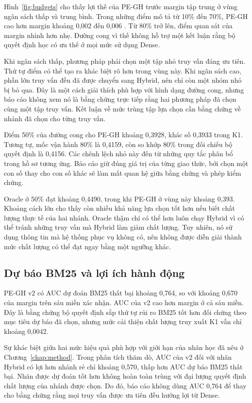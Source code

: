 Hình~\ref{fig:budgets} cho thấy lợi thế của PE-GH trước margin tập trung ở vùng ngân sách thấp và trung bình. Trong những điểm mô tả từ 10\% đến 70\%, PE-GH cao hơn margin khoảng 0,002 đến 0,006 \ndcg{}. Từ 80\% trở lên, điểm quan sát của margin nhỉnh hơn nhẹ. Đường cong vì thế không hỗ trợ một kết luận rằng bộ quyết định học có ưu thế ở mọi mức sử dụng Dense.

Khi ngân sách thấp, phương pháp phải chọn một tập nhỏ truy vấn đáng ưu tiên. Thứ tự điểm có thể tạo ra khác biệt rõ hơn trong vùng này. Khi ngân sách cao, phần lớn truy vấn đều đã được chuyển sang Hybrid, nên chỉ còn một nhóm nhỏ bị bỏ qua. Đây là một cách giải thích phù hợp với hình dạng đường cong, nhưng báo cáo không xem nó là bằng chứng trực tiếp rằng hai phương pháp đã chọn cùng một tập truy vấn. Kết luận về mức trùng tập lựa chọn cần bằng chứng về nhánh đã chọn cho từng truy vấn.

Điểm 50\% của đường cong cho PE-GH khoảng 0,3928, khác số 0,3933 trong K1. Tương tự, mốc vận hành 80\% là 0,4159, còn so khớp 80\% trong đối chiếu bộ quyết định là 0,4156. Các chênh lệch nhỏ này đến từ những quy tắc phân bổ trong hồ sơ tương ứng. Báo cáo giữ đúng giá trị của từng giao thức, bởi chọn một con số thay cho con số khác sẽ làm mất quan hệ giữa bằng chứng và phép kiểm chứng.

Oracle ở 50\% đạt khoảng 0,4490, trong khi PE-GH ở vùng này khoảng 0,393. Khoảng cách lớn cho thấy còn nhiều khả năng lựa chọn tốt hơn nếu biết chất lượng thực tế của hai nhánh. Oracle thậm chí có thể hơn luôn chạy Hybrid vì có thể tránh những truy vấn mà Hybrid làm giảm chất lượng. Tuy nhiên, nó sử dụng thông tin mà hệ thống phục vụ không có, nên không được diễn giải thành mức chất lượng có thể đạt ngay bằng một ngưỡng khác.

\subsection{Dự báo BM25 và lợi ích hành động}
PE-GH v2 có AUC dự đoán BM25 thất bại khoảng 0,764, so với khoảng 0,670 của margin trên sáu miền xác nhận. AUC của v2 cao hơn margin ở cả sáu miền. Đây là bằng chứng bộ quyết định sắp thứ tự rủi ro BM25 tốt hơn đối chứng theo mục tiêu dự báo đã chọn, nhưng mức cải thiện chất lượng truy xuất K1 vẫn chỉ khoảng 0,0042.

Sự khác biệt giữa hai mức hiệu quả phù hợp với giới hạn của nhãn học đã nêu ở Chương~\ref{chap:method}. Trong phân tích thăm dò, AUC của v2 đối với nhãn Hybrid có lợi hơn nhánh rẻ chỉ khoảng 0,570, thấp hơn AUC dự báo BM25 thất bại. Nhãn được dự đoán tốt hơn không hoàn toàn trùng với đại lượng quyết định chất lượng của nhánh được chọn. Do đó, báo cáo không dùng AUC 0,764 để thay cho bằng chứng rằng mọi truy vấn được ưu tiên đều hưởng lợi từ Dense.

